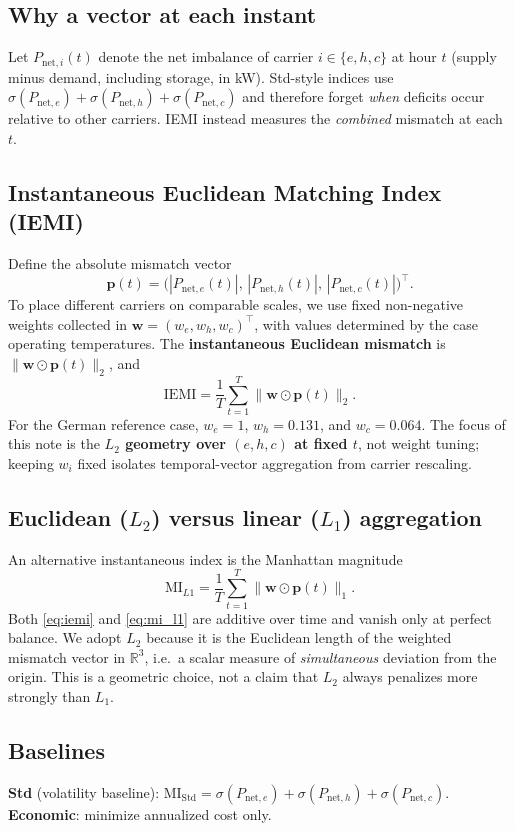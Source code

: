 \subsection{Why a vector at each instant}

Let $P_{\text{net},i}(t)$ denote the net imbalance of carrier $i \in \{e,h,c\}$ at hour $t$ (supply minus demand, including storage, in kW). Std-style indices use $\sigma(P_{\text{net},e})+\sigma(P_{\text{net},h})+\sigma(P_{\text{net},c})$ and therefore forget \emph{when} deficits occur relative to other carriers. IEMI instead measures the \emph{combined} mismatch at each $t$.

\subsection{Instantaneous Euclidean Matching Index (IEMI)}

Define the absolute mismatch vector
\begin{equation}
    \mathbf{p}(t) = \bigl(|P_{\text{net},e}(t)|,\,|P_{\text{net},h}(t)|,\,|P_{\text{net},c}(t)|\bigr)^\top .
\end{equation}
To place different carriers on comparable scales, we use fixed non-negative weights collected in $\mathbf{w}=(w_e,w_h,w_c)^\top$, with values determined by the case operating temperatures. The \textbf{instantaneous Euclidean mismatch} is $\bigl\| \mathbf{w} \odot \mathbf{p}(t) \bigr\|_2$, and
\begin{equation}
    \text{IEMI} = \frac{1}{T} \sum_{t=1}^{T} \bigl\| \mathbf{w} \odot \mathbf{p}(t) \bigr\|_2 .
    \label{eq:iemi}
\end{equation}
For the German reference case, $w_e=1$, $w_h=0.131$, and $w_c=0.064$. The focus of this note is the \textbf{$L_2$ geometry over $(e,h,c)$ at fixed $t$}, not weight tuning; keeping $w_i$ fixed isolates temporal-vector aggregation from carrier rescaling.

\subsection{Euclidean ($L_2$) versus linear ($L_1$) aggregation}

An alternative instantaneous index is the Manhattan magnitude
\begin{equation}
    \text{MI}_{L1} = \frac{1}{T} \sum_{t=1}^{T} \bigl\| \mathbf{w} \odot \mathbf{p}(t) \bigr\|_1 .
    \label{eq:mi_l1}
\end{equation}
Both \eqref{eq:iemi} and \eqref{eq:mi_l1} are additive over time and vanish only at perfect balance. We adopt $L_2$ because it is the Euclidean length of the weighted mismatch vector in $\mathbb{R}^3$, i.e.\ a scalar measure of \emph{simultaneous} deviation from the origin. This is a geometric choice, not a claim that $L_2$ always penalizes more strongly than $L_1$.

\subsection{Baselines}

\textbf{Std} (volatility baseline): $\text{MI}_{\text{Std}} = \sigma(P_{\text{net},e})+\sigma(P_{\text{net},h})+\sigma(P_{\text{net},c})$. \textbf{Economic}: minimize annualized cost only.
